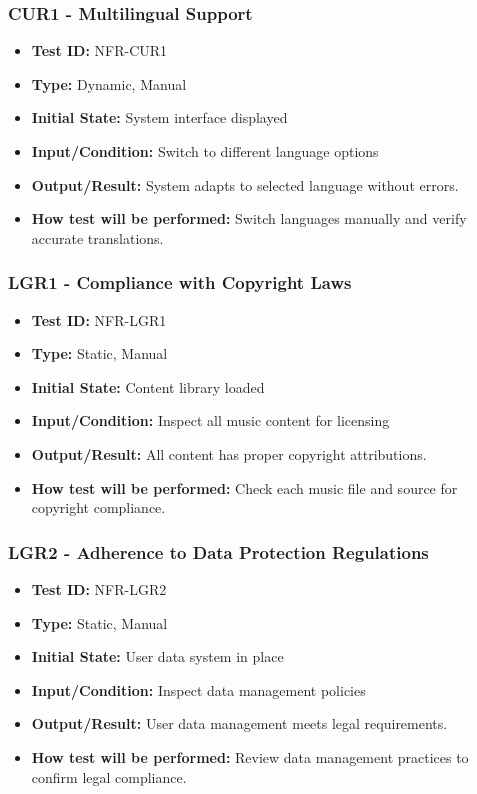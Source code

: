 \documentclass[12pt, titlepage]{article}
\begin{document}
\subsubsection{CUR1 - Multilingual Support}
\begin{itemize}
    \item \textbf{Test ID:} NFR-CUR1
    \item \textbf{Type:} Dynamic, Manual
    \item \textbf{Initial State:} System interface displayed
    \item \textbf{Input/Condition:} Switch to different language options
    \item \textbf{Output/Result:} System adapts to selected language without errors.
    \item \textbf{How test will be performed:} Switch languages manually and verify accurate translations.
\end{itemize}

\subsubsection{LGR1 - Compliance with Copyright Laws}
\begin{itemize}
    \item \textbf{Test ID:} NFR-LGR1
    \item \textbf{Type:} Static, Manual
    \item \textbf{Initial State:} Content library loaded
    \item \textbf{Input/Condition:} Inspect all music content for licensing
    \item \textbf{Output/Result:} All content has proper copyright attributions.
    \item \textbf{How test will be performed:} Check each music file and source for copyright compliance.
\end{itemize}

\subsubsection{LGR2 - Adherence to Data Protection Regulations}
\begin{itemize}
    \item \textbf{Test ID:} NFR-LGR2
    \item \textbf{Type:} Static, Manual
    \item \textbf{Initial State:} User data system in place
    \item \textbf{Input/Condition:} Inspect data management policies
    \item \textbf{Output/Result:} User data management meets legal requirements.
    \item \textbf{How test will be performed:} Review data management practices to confirm legal compliance.
\end{itemize}
\end{document}
